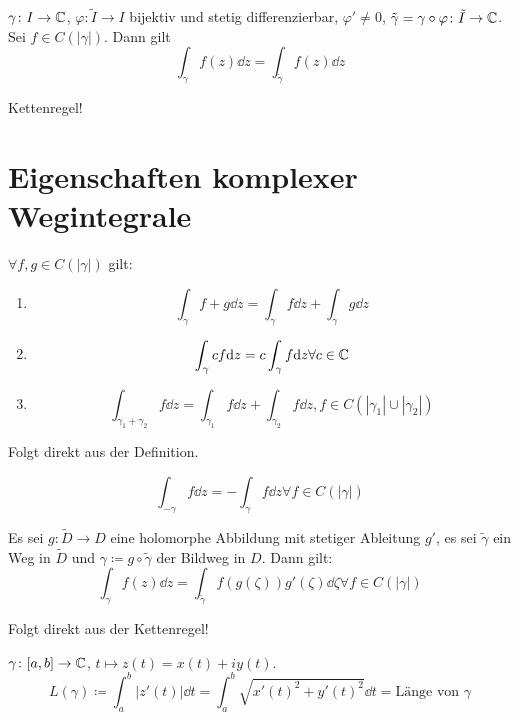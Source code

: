 \begin{satz}
	$ \gamma\colon I\rightarrow\mathbb{C} $, $ \varphi\colon\tilde I\rightarrow I $ bijektiv und stetig differenzierbar, $ \varphi'\neq 0 $, $ \tilde\gamma=\gamma\circ\varphi\colon \tilde I\rightarrow\mathbb{C} $. Sei $ f\in C(|\gamma|) $. Dann gilt
	\[ \int_\gamma f(z)\dd z=\int_{\tilde{\gamma}}^{}f(z)\dd z \]
\end{satz}	
\begin{beweis}
	Kettenregel!
\end{beweis}
\newpage
\section{Eigenschaften komplexer Wegintegrale}
\begin{satz}[Rechenregeln]
	$ \forall f,g\in C(|\gamma|) $ gilt:
	\begin{enumerate}
		\item \[ \int_{\gamma}^{} f+g\dd z=\int_{\gamma}^{} f\dd z+\int_{\gamma}^{} g\dd z \]
		\item \[ \int_{\gamma}^{} cf\mathrm d z=c\int_{\gamma}^{}f\mathrm d z\forall c\in\mathbb{C} \]
		\item \[ \int_{\gamma_1+\gamma_2}^{}f\dd z=\int_{\gamma_1}^{}f\dd z+\int_{\gamma_2}^{}f\dd z, f\in C(|\gamma_1|\cup|\gamma_2|) \]
	\end{enumerate}
\end{satz}
\begin{beweis}
	Folgt direkt aus der Definition.
\end{beweis}
\begin{satz}[Umkehrregel]
	\[ \int_{-\gamma}^{}f\dd z=-\int_{\gamma}^{} f\dd z\forall f\in C(|\gamma|) \]
\end{satz}
\begin{satz}[Transformationsregel]
	Es sei $ g\colon\tilde D\rightarrow D $ eine holomorphe Abbildung mit stetiger Ableitung $ g' $, es sei $ \tilde{\gamma} $ ein Weg in $ \tilde D $ und $ \gamma\coloneqq g\circ\tilde{\gamma} $ der Bildweg in $ D $. Dann gilt:
	\[ \int_{\gamma}^{}f(z)\dd z=\int_{\tilde{\gamma}}^{}f(g(\zeta))g'(\zeta)\dd\zeta\forall f\in C(|\gamma|) \]
\end{satz}
\begin{beweis}
	Folgt direkt aus der Kettenregel!
\end{beweis}
\begin{definition}
	$ \gamma\colon[a,b]\rightarrow\mathbb{C} $, $ t\mapsto z(t)=x(t)+iy(t) $.
	\[ L(\gamma)\coloneqq\int_a^b|z'(t)|\dd t=\int_a^b\sqrt{x'(t)^2+y'(t)^2}\dd t=\text{L\"ange von }\gamma \]
\end{definition}
